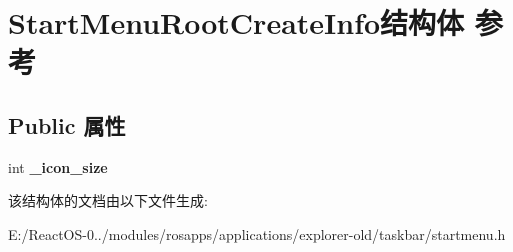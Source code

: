 \hypertarget{struct_start_menu_root_create_info}{}\section{Start\+Menu\+Root\+Create\+Info结构体 参考}
\label{struct_start_menu_root_create_info}
\subsection*{Public 属性}
\begin{DoxyCompactItemize}
\item 
\mbox{\label{struct_start_menu_root_create_info_ac26f11fabd1f9b6cac58c93ab43ee4dc}} 
int {\bfseries \+\_\+icon\+\_\+size}
\end{DoxyCompactItemize}


该结构体的文档由以下文件生成\+:\begin{DoxyCompactItemize}
\item 
E\+:/\+React\+O\+S-\/0../modules/rosapps/applications/explorer-\/old/taskbar/startmenu.\+h\end{DoxyCompactItemize}
